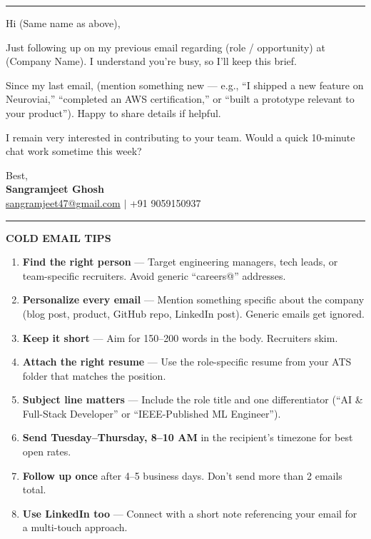 \documentclass[11pt]{article}
\newcommand{\blank}[1]{\underline{\hspace{#1}}}
\begin{document}
\vspace{4pt}
\noindent\rule{\textwidth}{0.2pt}
\vspace{4pt}

Hi \blank{3cm} (Same name as above),

Just following up on my previous email regarding \blank{3cm} (role / opportunity) at \blank{3cm} (Company Name). I understand you're busy, so I'll keep this brief.

Since my last email, \blank{5cm} (mention something new — e.g., ``I shipped a new feature on Neuroviai,'' ``completed an AWS certification,'' or ``built a prototype relevant to your product''). Happy to share details if helpful.

I remain very interested in contributing to your team. Would a quick 10-minute chat work sometime this week?

\vspace{14pt}

Best, \\[2pt]
\textbf{Sangramjeet Ghosh} \\
\href{mailto:sangramjeet47@gmail.com}{sangramjeet47@gmail.com} $|$ +91 9059150937

\vspace{20pt}
\noindent\rule{\textwidth}{0.6pt}


\begin{center}
{\large \textbf{COLD EMAIL TIPS}}
\end{center}

\begin{enumerate}
\setlength{\itemsep}{4pt}
\item \textbf{Find the right person} — Target engineering managers, tech leads, or team-specific recruiters. Avoid generic ``careers@'' addresses.
\item \textbf{Personalize every email} — Mention something specific about the company (blog post, product, GitHub repo, LinkedIn post). Generic emails get ignored.
\item \textbf{Keep it short} — Aim for 150--200 words in the body. Recruiters skim.
\item \textbf{Attach the right resume} — Use the role-specific resume from your ATS folder that matches the position.
\item \textbf{Subject line matters} — Include the role title and one differentiator (``AI \& Full-Stack Developer'' or ``IEEE-Published ML Engineer'').
\item \textbf{Send Tuesday--Thursday, 8--10 AM} in the recipient's timezone for best open rates.
\item \textbf{Follow up once} after 4--5 business days. Don't send more than 2 emails total.
\item \textbf{Use LinkedIn too} — Connect with a short note referencing your email for a multi-touch approach.
\end{enumerate}
\end{document}
